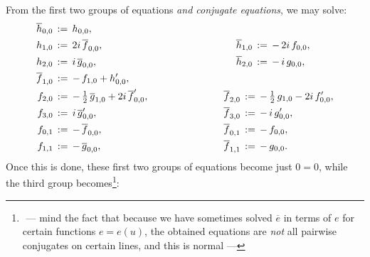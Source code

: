 \documentclass[12pt,twoside,leqno,openany]{amsart}
\begin{document}
\proof
From the first two groups of equations {\em and conjugate equations}, 
we may solve:
\[
\aligned
{}&
\aligned
\overline{h}_{0,0}
&
\,:=\,
h_{0,0},
\\
h_{1,0}
&
\,:=\,
2i\,\overline{f}_{0,0},
&
\ \ \ \ \ \ \ \ \ \ \ \ \ \ \ \ \ \ \ \
\ \ \ \ \ \ \ \ \ \ \ \ \ \ \ \ \ \,
\overline{h}_{1,0}
&
\,:=\,
-\,2i\,f_{0,0},
\\
h_{2,0}
&
\,:=\,
i\,\overline{g}_{0,0},
&
\ \ \ \ \ \ \ \ \ \ \ \ \ \ \ \ \ \ \ \
\ \ \ \ \ \ \ \ \ \ \ \ \ \ \ \ \ \,
\overline{h}_{2,0}
&
\,:=\,
-\,i\,g_{0,0},
\endaligned
\\
{}
&
\aligned
\overline{f}_{1,0}
&
\,:=\,
-\,f_{1,0}
+
h_{0,0}',
&
\ \ \ \ \ \ \ \ \ \ \ \ \ \ \ \ \ \ \ \
&
\\
f_{2,0}
&
\,:=\,
-\,\tfrac{1}{2}\,
\overline{g}_{1,0}
+
2i\,\overline{f}_{0,0}',
&
\ \ \ \ \ \ \ \ \ \ \ \ \ \ \ \ \ \ \ \
\overline{f}_{2,0}
&
\,:=\,
-\,\tfrac{1}{2}\,
g_{1,0}
-
2i\,f_{0,0}',
\\
f_{3,0}
&
\,:=\,
i\,\overline{g}_{0,0}',
&
\ \ \ \ \ \ \ \ \ \ \ \ \ \ \ \ \ \ \ \
\overline{f}_{3,0}
&
\,:=\,
-\,i\,g_{0,0}',
\\
f_{0,1}
&
\,:=\,
-\,\overline{f}_{0,0},
&
\ \ \ \ \ \ \ \ \ \ \ \ \ \ \ \ \ \ \ \
\overline{f}_{0,1}
&
\,:=\,
-\,f_{0,0},
\\
f_{1,1}
&
\,:=\,
-\,\overline{g}_{0,0},
&
\ \ \ \ \ \ \ \ \ \ \ \ \ \ \ \ \ \ \ \
\overline{f}_{1,1}
&
\,:=\,
-\,g_{0,0}.
\endaligned
\endaligned
\]
Once this is done, these first two groups of equations become just
$0 = 0$, while the third group 
becomes\footnote{\,\,---\,\,mind 
the fact that because we have sometimes
solved $\overline{e}$ in terms of $e$ for certain
functions $e = e(u)$, the obtained equations
are {\em not} all pairwise conjugates on certain lines,
and this is normal\,\,---}:
\end{document}

